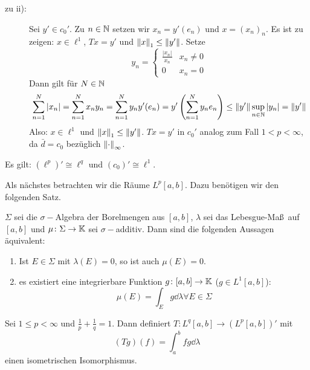 \begin{beweis}
\begin{description}
		\item[zu ii):] Sei $ y'\in c_0' $. Zu $ n\in\mathbb{N} $ setzen wir $ x_n=y'(e_n) $ und $ x=(x_n)_n $. Es ist zu zeigen: $ x\in\ell^1 $, $ Tx=y' $ und $ \left\|x\right\|_1\leq\left\|y'\right\| $. Setze
		\[ y_n= \begin{cases}
		\frac{|x_n|}{x_n}&x_n\neq 0\\0&x_n=0
		\end{cases} \]
		Dann gilt f\"ur $ N\in\mathbb{N} $
		\[ \sum_{n=1}^{N}|x_n|=\sum_{n=1}^{N}x_ny_n=\sum_{n=1}^{N}y_ny'(e_n)=y'\left(\sum_{n=1}^{N}y_ne_n\right)\leq\left\|y'\right\|\sup_{n\in\mathbb{N}}|y_n|=\left\|y'\right\| \]
		Also: $ x\in\ell^1 $ und $ \left\|x\right\|_1\leq\left\|y'\right\| $. $ Tx=y' $ in $ c_0' $ analog zum Fall $ 1<p<\infty $, da $ \bar d=c_0 $ bez\"uglich $ \left\|\cdot\right\|_\infty $.
	\end{description}
\end{beweis}
\begin{bemerkung*}
	Es gilt: $ (\ell^p)'\cong\ell^q $ und $ (c_0)'\cong\ell^1 $.
\end{bemerkung*}
Als n\"achstes betrachten wir die R\"aume $ L^p[a,b] $. Dazu ben\"otigen wir den folgenden Satz.
\begin{satz}
	$ \Sigma $ sei die $ \sigma- $Algebra der Borelmengen aus $ [a,b] $, $ \lambda $ sei das Lebesgue-Ma\ss\ auf $ [a,b] $ und $ \mu\colon\Sigma\rightarrow\mathbb{K} $ sei $ \sigma- $additiv. Dann sind die folgenden Aussagen \"aquivalent:
	\begin{enumerate}
		\item Ist $ E\in\Sigma $ mit $ \lambda(E)=0 $, so ist auch $ \mu(E)=0 $.
		\item es existiert eine integrierbare Funktion $ g\colon[a,b]\rightarrow\mathbb{K} $ ($ g\in L^1[a,b] $):
		\[ \mu(E)=\int_E g\dd\lambda\forall E\in\Sigma \]
	\end{enumerate} 
\end{satz}
\begin{satz}
	Sei $ 1\leq p<\infty $ und $ \frac{1}{p}+\frac{1}{q}=1 $. Dann definiert $ T\colon L^q[a,b]\rightarrow (L^p[a,b])' $ mit
	\[ (Tg)(f)=\int_a^b fg\dd\lambda \] einen isometrischen Isomorphismus.
\end{satz}
\newpage
